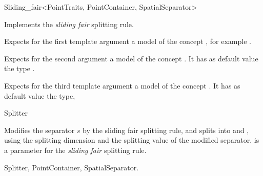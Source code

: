 

\begin{ccRefFunctionObjectClass}{Sliding_fair<PointTraits, PointContainer, SpatialSeparator>}


\ccDefinition
Implements the {\em sliding fair} splitting rule.


\ccParameters

Expects for the first template argument a model of
the concept , 
for example . 

Expects for the second argument a model of the concept . It has as default value
the type .

Expects for the third template argument a model of the concept . It has as default value
the type, 


\ccIsModel

Splitter

\ccTypes



\ccOperations

{Modifies the separator $s$ by the sliding fair splitting rule, 
and splits  into  and ,
using the splitting dimension and the splitting value of the modified separator.
 is a parameter for the {\em sliding fair} splitting rule.
}

\ccSeeAlso

Splitter, PointContainer, SpatialSeparator.

\end{ccRefFunctionObjectClass}



